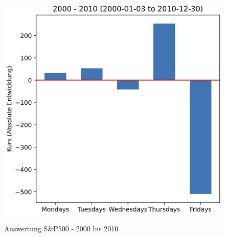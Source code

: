 \begin{figure}[!htb]
    \centering
    \begin{minipage}[t]{0.5\textwidth}
        \caption[]{Auswertung S\&P500 - 2000 bis 2010}
        \includegraphics[width=1\textwidth]{img/Auswertung_SP500_2000-2010.PNG}\\
        \label{fig:ausw_sp500_2000_2010}
    \end{minipage}
\end{figure}

\clearpage